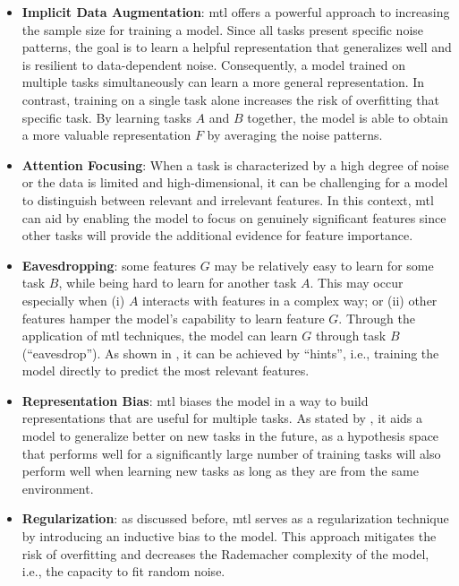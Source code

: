 \begin{itemize}
\item \textbf{Implicit Data Augmentation}: \acl{mtl} offers a powerful approach to increasing the sample size for training a model. Since all tasks present specific noise patterns, the goal is to learn a helpful representation that generalizes well and is resilient to data-dependent noise. Consequently, a model trained on multiple tasks simultaneously can learn a more general representation. In contrast, training on a single task alone increases the risk of overfitting that specific task. By learning tasks $A$ and $B$ together, the model is able to obtain a more valuable representation $F$ by averaging the noise patterns.

\item \textbf{Attention Focusing}: When a task is characterized by a high degree of noise or the data is limited and high-dimensional, it can be challenging for a model to distinguish between relevant and irrelevant features. In this context, \acs{mtl} can aid by enabling the model to focus on genuinely significant features since other tasks will provide the additional evidence for feature importance.

\item \textbf{Eavesdropping}: some features $G$ may be relatively easy to learn for some task $B$, while being hard to learn for another task $A$. This may occur especially when (i) $A$ interacts with features in a complex way; or (ii) other features hamper the model's capability to learn feature $G$. Through the application of \acs{mtl} techniques, the model can learn $G$ through task $B$ (``eavesdrop''). As shown in \citep{abu1990learning}, it can be achieved by ``hints'', i.e., training the model directly to predict the most relevant features.

\item \textbf{Representation Bias}: \acs{mtl} biases the model in a way to build representations that are useful for multiple tasks. As stated by \cite{baxter2000model}, it aids a model to generalize better on new tasks in the future, as a hypothesis space that performs well for a significantly large number of training tasks will also perform well when learning new tasks as long as they are from the same environment.

\item \textbf{Regularization}: as discussed before, \acl{mtl} serves as a regularization technique by introducing an inductive bias to the model. This approach mitigates the risk of overfitting and decreases the Rademacher complexity of the model, i.e., the capacity to fit random noise.
\end{itemize}

